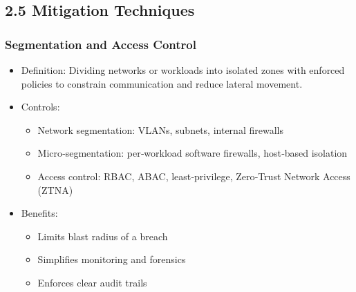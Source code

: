 \documentclass[11pt]{article}
\begin{document}
\subsection{2.5 Mitigation Techniques}
\label{sec:org7487ba1}
\subsubsection{Segmentation and Access Control}
\label{sec:org6f73297}
\begin{itemize}
\item Definition: Dividing networks or workloads into isolated zones with enforced policies to constrain communication and reduce lateral movement.
\item Controls:
\begin{itemize}
\item Network segmentation: VLANs, subnets, internal firewalls
\item Micro‑segmentation: per‑workload software firewalls, host‑based isolation
\item Access control: RBAC, ABAC, least‑privilege, Zero‑Trust Network Access (ZTNA)
\end{itemize}
\item Benefits:
\begin{itemize}
\item Limits blast radius of a breach
\item Simplifies monitoring and forensics
\item Enforces clear audit trails
\end{itemize}
\end{itemize}
\end{document}
